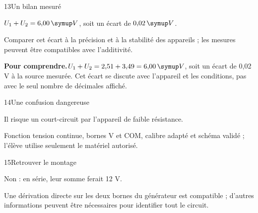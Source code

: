 \par\noindent\begin{minipage}{\linewidth}
\begin{corrige}{13}{Un bilan mesuré}
\begin{questions}
\item $U_1+U_2=6{,}00\unite V$, soit un écart de $0{,}02\unite V$.
\item Comparer cet écart à la précision et à la stabilité des appareils ; les mesures peuvent être compatibles avec l’additivité.
\end{questions}
\par\smallskip\noindent\textbf{Pour comprendre.}\enspace $U_1+U_2=2{,}51+3{,}49=6{,}00\unite V$, soit un écart de 0,02 V à la source mesurée. Cet écart se discute avec l’appareil et les conditions, pas avec le seul nombre de décimales affiché.\par
\end{corrige}
\end{minipage}
\par\noindent\begin{minipage}{\linewidth}
\begin{corrige}{14}{Une confusion dangereuse}
\begin{questions}
\item Il risque un court-circuit par l’appareil de faible résistance.
\item Fonction tension continue, bornes V et COM, calibre adapté et schéma validé ; l’élève utilise seulement le matériel autorisé.
\end{questions}
\end{corrige}
\end{minipage}
\par\noindent\begin{minipage}{\linewidth}
\begin{corrige}{15}{Retrouver le montage}
\begin{questions}
\item Non : en série, leur somme ferait 12 V.
\item Une dérivation directe sur les deux bornes du générateur est compatible ; d’autres informations peuvent être nécessaires pour identifier tout le circuit.
\end{questions}
\end{corrige}
\end{minipage}

